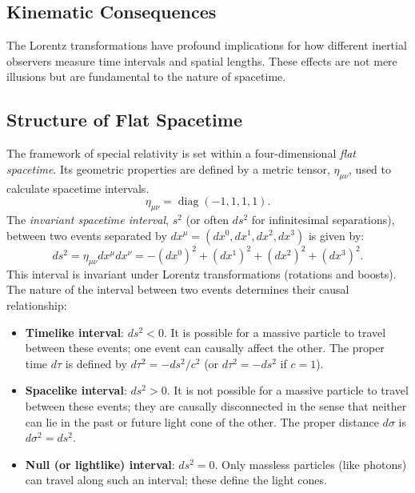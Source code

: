 \documentclass{amsart}
\theoremstyle{definition}
\theoremstyle{remark}
\DeclareMathOperator{\diag}{diag}
\begin{document}
\subsection{Kinematic Consequences}
\label{subsec:sr_kinematics}
The Lorentz transformations have profound implications for how different inertial observers measure time intervals and spatial lengths. These effects are not mere illusions but are fundamental to the nature of spacetime.

\subsection{Structure of Flat Spacetime}
\label{subsec:sr_structure}
The framework of special relativity is set within a four-dimensional \emph{flat spacetime}. Its geometric properties are defined by a metric tensor, $\eta_{\mu\nu}$, used to calculate spacetime intervals.
\begin{equation*}
  \eta_{\mu\nu} = \diag(-1,1,1,1).
\end{equation*}
The \emph{invariant spacetime interval}, $s^2$ (or often $ds^2$ for infinitesimal separations), between two events separated by $dx^\mu = (dx^0, dx^1, dx^2, dx^3)$ is given by:
\begin{equation*}
  ds^2 = \eta_{\mu\nu} dx^\mu dx^\nu = -(dx^0)^2 + (dx^1)^2 + (dx^2)^2 + (dx^3)^2.
\end{equation*}
This interval is invariant under Lorentz transformations (rotations and boosts). The nature of the interval between two events determines their causal relationship:
\begin{itemize}
    \item \textbf{Timelike interval}: $ds^2 < 0$. It is possible for a massive particle to travel between these events; one event can causally affect the other. The proper time $d\tau$ is defined by $d\tau^2 = -ds^2/c^2$ (or $d\tau^2 = -ds^2$ if $c=1$).
    \item \textbf{Spacelike interval}: $ds^2 > 0$. It is not possible for a massive particle to travel between these events; they are causally disconnected in the sense that neither can lie in the past or future light cone of the other. The proper distance $d\sigma$ is $d\sigma^2 = ds^2$.
    \item \textbf{Null (or lightlike) interval}: $ds^2 = 0$. Only massless particles (like photons) can travel along such an interval; these define the light cones.
\end{itemize}
\end{document}
